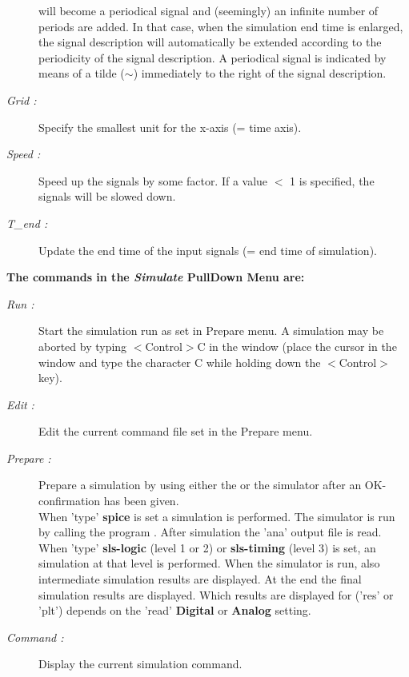 \begin{description}
will become a periodical signal and (seemingly)
an infinite number of periods are added.
In that case, when the simulation end time is enlarged,
the signal description will automatically
be extended according to the periodicity of the signal description.
A periodical signal is indicated by means of a tilde ($\sim$)
immediately to the right of the signal description.
\item [{\it Grid :}]
Specify the smallest unit for the x-axis (= time axis).
\item [{\it Speed :}]
Speed up the signals by some factor.
If a value $<$ 1 is specified, the signals will be slowed down.
\item [{\it T\_end :}]
Update the end time of the input signals (= end time of simulation).
\end{description}

{\bf The commands in the {\it Simulate} PullDown Menu are:}
\begin{description}
\item [{\it Run :}]
Start the simulation run as set in Prepare menu.
A simulation may be aborted by typing $<$Control$>$C
in the  window
(place the cursor in the  window and
type the character C while holding down the $<$Control$>$ key).
\item [{\it Edit :}]
Edit the current command file set in the Prepare menu.
\item [{\it Prepare :}]
Prepare a simulation by using either the  or the 
simulator
after an OK-confirmation has been given.
\\
When 'type' {\bf spice} is set a  simulation is performed.
The  simulator is run by calling the program . 
After simulation the 'ana'  output file is read.
\\
When 'type' {\bf sls-logic} (level 1 or 2) or {\bf sls-timing} (level 3) is set,
an  simulation at that level is performed.
When the 
simulator is run, also intermediate simulation
results are displayed.
At the end
the final simulation results
are displayed.
Which results are displayed for  ('res' or 'plt') depends on
the 'read' {\bf Digital} or {\bf Analog} setting.
\item [{\it Command :}]
Display the current simulation command.
\end{description}

